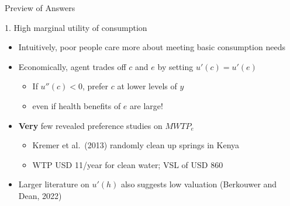 \documentclass[
  ignorenonframetext,
  aspectratio=169]{beamer}
\providecommand{\tightlist}{%
  \setlength{\itemsep}{0pt}\setlength{\parskip}{0pt}}
\begin{document}
\begin{frame}{}
\protect\hypertarget{section-6}{}
\centering

\huge Preview of Answers
\end{frame}

\begin{frame}{1. High marginal utility of consumption}
\protect\hypertarget{high-marginal-utility-of-consumption}{}
\begin{itemize}
\tightlist
\item
  Intuitively, poor people care more about meeting basic consumption
  needs \vfill
\item
  Economically, agent trades off \(c\) and \(e\) by setting
  \(u'(c) = u'(e)\)

  \begin{itemize}
  \tightlist
  \item
    If \(u''(c)<0\), prefer \(c\) at lower levels of \(y\)
  \item
    even if health benefits of \(e\) are large! \vfill
  \end{itemize}
\item
  \textbf{Very} few revealed preference studies on \(MWTP_{e}\)

  \begin{itemize}
  \tightlist
  \item
    Kremer et al.~(2013) randomly clean up springs in Kenya
  \item
    WTP USD 11/year for clean water; VSL of USD 860 \vfill
  \end{itemize}
\item
  Larger literature on \(u'(h)\) also suggests low valuation (Berkouwer
  and Dean, 2022) \vfill
\end{itemize}
\end{frame}
\end{document}
